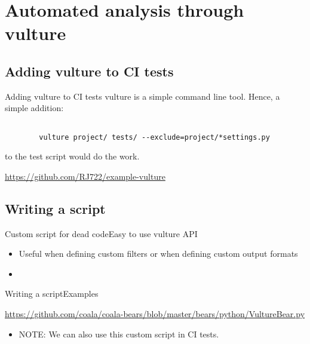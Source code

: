 \documentclass{beamer}
\begin{document}
\section{Automated analysis through vulture}

\subsection{Adding vulture to CI tests}

\begin{frame}{Adding vulture to CI tests}
    vulture is a simple command line tool.
    Hence, a simple addition:

    \begin{verbatim}

        vulture project/ tests/ --exclude=project/*settings.py

    \end{verbatim}

    to the test script would do the work.

    \begin{example}
        \url{https://github.com/RJ722/example-vulture}
    \end{example}

\end{frame}

\subsection{Writing a script}

\begin{frame}{Custom script for dead code}{Easy to use vulture API}
    \begin{itemize}
        \item Useful when defining custom filters \pause or when defining custom output formats
        \pause
        \item \inputminted{python}{custom_script.py}
    \end{itemize}
\end{frame}

\begin{frame}{Writing a script}{Examples}
    \begin{example}
        \url{https://github.com/coala/coala-bears/blob/master/bears/python/VultureBear.py}
    \end{example}
    \pause
    \begin{itemize}
        \item NOTE: We can also use this custom script in CI tests.
    \end{itemize}
\end{frame}
\end{document}
